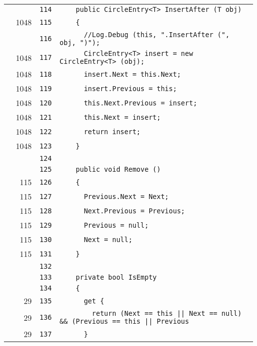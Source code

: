 \documentclass[a4paper,10pt]{article}
\begin{document}
\begin{longtable}[l]{lrrl}
\cellcolor{gray} &  & \verb~114~ & \verb~    public CircleEntry<T> InsertAfter (T obj)~\\
\cellcolor{green} & 1048 & \verb~115~ & \verb~    {~\\
\cellcolor{gray} &  & \verb~116~ & \verb~      //Log.Debug (this, ".InsertAfter (", obj, ")");~\\
\cellcolor{green} & 1048 & \verb~117~ & \verb~      CircleEntry<T> insert = new CircleEntry<T> (obj);~\\
\cellcolor{green} & 1048 & \verb~118~ & \verb~      insert.Next = this.Next;~\\
\cellcolor{green} & 1048 & \verb~119~ & \verb~      insert.Previous = this;~\\
\cellcolor{green} & 1048 & \verb~120~ & \verb~      this.Next.Previous = insert;~\\
\cellcolor{green} & 1048 & \verb~121~ & \verb~      this.Next = insert;~\\
\cellcolor{green} & 1048 & \verb~122~ & \verb~      return insert;~\\
\cellcolor{green} & 1048 & \verb~123~ & \verb~    }~\\
\cellcolor{gray} &  & \verb~124~ & \verb~~\\
\cellcolor{gray} &  & \verb~125~ & \verb~    public void Remove ()~\\
\cellcolor{green} & 115 & \verb~126~ & \verb~    {~\\
\cellcolor{green} & 115 & \verb~127~ & \verb~      Previous.Next = Next;~\\
\cellcolor{green} & 115 & \verb~128~ & \verb~      Next.Previous = Previous;~\\
\cellcolor{green} & 115 & \verb~129~ & \verb~      Previous = null;~\\
\cellcolor{green} & 115 & \verb~130~ & \verb~      Next = null;~\\
\cellcolor{green} & 115 & \verb~131~ & \verb~    }~\\
\cellcolor{gray} &  & \verb~132~ & \verb~~\\
\cellcolor{gray} &  & \verb~133~ & \verb~    private bool IsEmpty~\\
\cellcolor{gray} &  & \verb~134~ & \verb~    {~\\
\cellcolor{green} & 29 & \verb~135~ & \verb~      get {~\\
\cellcolor{green} & 29 & \verb~136~ & \verb~        return (Next == this || Next == null) && (Previous == this || Previous~\\
\cellcolor{green} & 29 & \verb~137~ & \verb~      }~\\

\end{longtable}
\end{document}
